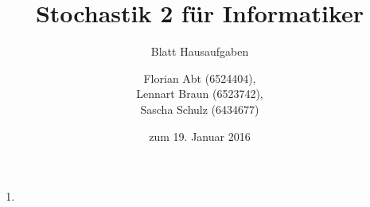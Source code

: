 \documentclass[a4paper]{scrartcl}
\title{Stochastik 2 für Informatiker}
\subtitle{Blatt {\blattnr} Hausaufgaben}
\author{
    Florian Abt (6524404), \\
    Lennart Braun (6523742), \\
    Sascha Schulz (6434677)
}
\date{zum 19. Januar 2016}
\def \blattnr {12}
\begin{document}
\maketitle

\begin{enumerate}[label=\bfseries \blattnr.\arabic*]
    \item %



\end{enumerate}
\end{document}
